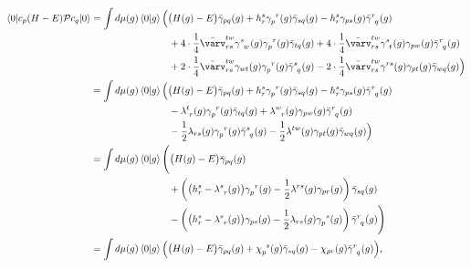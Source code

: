 \documentclass[11pt,letterpaper]{article}
\begin{document}
%
\begin{subequations}
\begin{align}
  \nonumber
  \braket{0|c_p (H - E) \mathcal{P} c_q|0}
  &= \int d\mu(g) \braket{0|g}
  \Bigl(
    \big(H(g) - E\big) \bar{\gamma}_{pq}(g)
    + h^{s}_{r}\gamma^{\phantom{p}r}_{p\phantom{r}}(g)\bar\gamma_{sq}(g)-h^{s}_{r}\gamma_{ps}(g)\bar\gamma^{r\phantom{q}}_{\phantom{r}q}(g)\\
    \nonumber
    &\hspace{8em}+ 4 \cdot \frac{1}{4}  \bar\varv^{tw}_{rs} \gamma_{\phantom{s}w}^{s\phantom{w}}(g)\gamma_{p\phantom{r}}^{\phantom{p}r}(g)\bar\gamma_{tq}(g) 
    + 4 \cdot \frac{1}{4} \bar\varv^{tw}_{rs}\gamma_{\phantom{s}t}^{s\phantom{t}}(g)\gamma_{pw}(g)\bar\gamma_{\phantom{r}q}^{r\phantom{q}}(g)\\
    &\hspace{8em}+ 2 \cdot \frac{1}{4} \bar\varv^{tw}_{rs}\gamma_{wt}(g)\gamma_{p\phantom{r}}^{\phantom{p}r}(g)\bar\gamma_{\phantom{s}q}^{s\phantom{q}}(g)
    - 2 \cdot \frac{1}{4} \bar\varv^{tw}_{rs}\gamma^{rs}(g)\gamma_{pt}(g)\bar\gamma_{wq}(g)
  \Bigr)\\
  \nonumber
  &= \int d\mu(g) \braket{0|g}
  \Bigl(
    \big(H(g) - E\big) \bar{\gamma}_{pq}(g)
    + h^{s}_{r}\gamma^{\phantom{p}r}_{p\phantom{r}}(g)\bar\gamma_{sq}(g)-h^{s}_{r}\gamma_{ps}(g)\bar\gamma^{r\phantom{q}}_{\phantom{r}q}(g)\\
    \nonumber
    &\hspace{8em}- \lambda^{t\phantom{r}}_{\phantom{t}r}(g) 
    \gamma_{p\phantom{r}}^{\phantom{p}r}(g) \bar{\gamma}_{tq}(g)
    + \lambda^{w\phantom{r}}_{\phantom{w}r}(g) 
    \gamma_{pw}(g) \bar{\gamma}^{r\phantom{q}}_{\phantom{r}q}(g)\\
    &\hspace{8em}- \frac{1}{2} \lambda_{rs}(g)
    \gamma_{p\phantom{r}}^{\phantom{p}r}(g)
    \bar{\gamma}^{s\phantom{q}}_{\phantom{s}q}(g)
    - \frac{1}{2} \lambda^{tw}(g)
    \gamma_{pt}(g)
    \bar{\gamma}_{wq}(g)
  \Bigr)\\
  \nonumber
  &= \int d\mu(g) \braket{0|g}
  \Biggl(
    \big(H(g) - E\big) \bar{\gamma}_{pq}(g)\\
    \nonumber
    &\hspace{8em}
    + \left(
      \big(h_r^s - \lambda^{s\phantom{r}}_{\phantom{s}r}(g)\big)
      \gamma_{p\phantom{r}}^{\phantom{p}r}(g)
      - \frac{1}{2} \lambda^{rs}(g) \gamma_{pr}(g)
    \right)
    \bar{\gamma}_{sq}(g)\\
    &\hspace{8em}
    - \left(
      \big(h_r^s - \lambda^{s\phantom{r}}_{\phantom{s}r}(g)\big)
      \gamma_{ps}(g)
      - \frac{1}{2} \lambda_{rs}(g) \gamma_{p\phantom{s}}^{\phantom{p}s}(g)
    \right)
    \bar{\gamma}^{r\phantom{q}}_{\phantom{r}q}(g)
  \Biggr)\\
  &= \int d\mu(g) \braket{0|g}
  \Big(
    \big(H(g) - E\big) \bar{\gamma}_{pq}(g)
    + \chi_{p\phantom{s}}^{\phantom{p}s}(g) \bar{\gamma}_{sq}(g)
    - \chi_{pr}(g) \bar{\gamma}^{r\phantom{q}}_{\phantom{r}q}(g)
  \Big),
\end{align}
\end{subequations}
\end{document}
